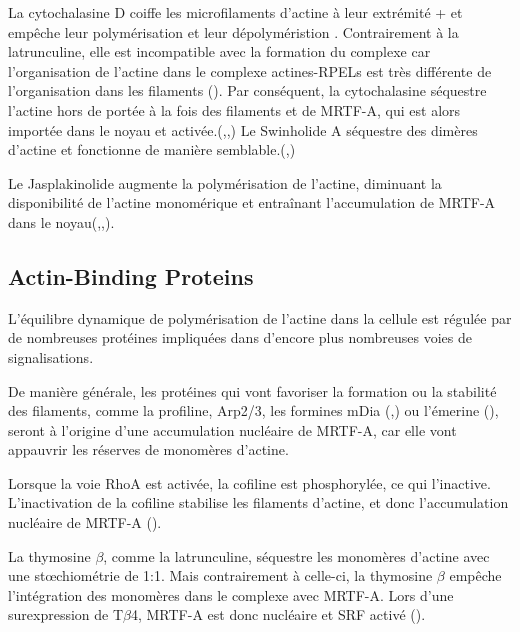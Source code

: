 \documentclass{report}
\begin{document}
La cytochalasine D coiffe les microfilaments d'actine à leur extrémité + et empêche leur polymérisation et leur dépolyméristion . 
Contrairement à la latrunculine, elle est incompatible avec la formation du complexe car l'organisation de l'actine dans le complexe actines-RPELs est très différente de l'organisation dans les filaments (\cite{treisman_structure_2011}). 
Par conséquent, la cytochalasine séquestre l'actine hors de portée à la fois des filaments et de MRTF-A, qui est alors importée dans le noyau et activée.(\cite{miralles_actin_2003},\cite{vartiainen_nuclear_2007},\cite{smith_induction_2013}) Le Swinholide A séquestre des dimères d'actine et fonctionne de manière semblable.(\cite{miralles_actin_2003},\cite{vartiainen_nuclear_2007})

Le Jasplakinolide augmente la polymérisation de l'actine, diminuant la disponibilité de l'actine monomérique et entraînant l'accumulation de MRTF-A dans le noyau(\cite{miralles_actin_2003},\cite{vartiainen_nuclear_2007},\cite{smith_induction_2013}). 


\subsection{Actin-Binding Proteins}

L'équilibre dynamique de polymérisation de l'actine dans la cellule est régulée par de nombreuses protéines impliquées dans d'encore plus nombreuses voies de signalisations. 

De manière générale, les protéines qui vont favoriser la formation ou la stabilité des filaments, comme la profiline, Arp2/3, les formines mDia (\cite{chan_force-induced_2010},\cite{baarlink_nuclear_2013}) ou l'émerine (\cite{ho_lamin_2013}), seront à l'origine d'une accumulation nucléaire de MRTF-A, car elle vont appauvrir les réserves de monomères d'actine. 

Lorsque la voie RhoA est activée, la cofiline est phosphorylée, ce qui l'inactive. L'inactivation de la cofiline stabilise les filaments d'actine, et donc l'accumulation nucléaire de MRTF-A (\cite{zhao_force_2007}). 

La thymosine $\beta$, comme la latrunculine, séquestre les monomères d'actine avec une st\oe chiométrie de 1:1. Mais contrairement à celle-ci, la thymosine $\beta$ empêche l'intégration des monomères dans le complexe avec MRTF-A. Lors d'une surexpression de T$\beta$4, MRTF-A est donc nucléaire et SRF activé (\cite{morita_g-actin_2013}).
\end{document}
